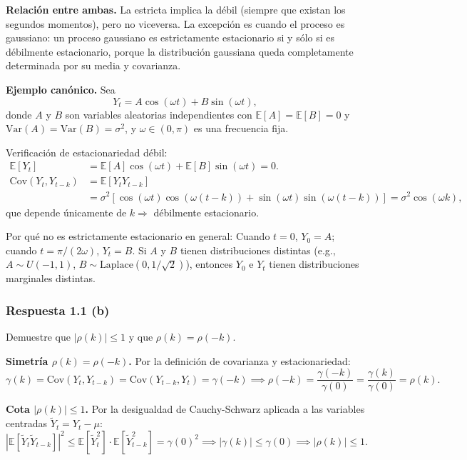 \documentclass[12pt, letterpaper]{article}
\begin{document}
\textbf{Relación entre ambas.} La estricta implica la débil (siempre que existan los segundos momentos), pero no viceversa. La excepción es cuando el proceso es gaussiano: un proceso gaussiano es estrictamente estacionario si y sólo si es débilmente estacionario, porque la distribución gaussiana queda completamente determinada por su media y covarianza.

\textbf{Ejemplo canónico.} Sea
\[
Y_t = A \cos(\omega t) + B \sin(\omega t),
\]
donde $A$ y $B$ son variables aleatorias independientes con $\mathbb{E}[A] = \mathbb{E}[B] = 0$ y $\text{Var}(A) = \text{Var}(B) = \sigma^2$, y $\omega \in (0, \pi)$ es una frecuencia fija.

Verificación de estacionariedad débil:
\begin{align*}
\mathbb{E}[Y_t] &= \mathbb{E}[A] \cos(\omega t) + \mathbb{E}[B] \sin(\omega t) = 0. \\
\text{Cov}(Y_t, Y_{t-k}) &= \mathbb{E}[Y_t Y_{t-k}] \\
&= \sigma^2 [\cos(\omega t) \cos(\omega(t-k)) + \sin(\omega t) \sin(\omega(t-k))] = \sigma^2 \cos(\omega k),
\end{align*}
que depende únicamente de $k \Rightarrow$ débilmente estacionario.

Por qué no es estrictamente estacionario en general: Cuando $t=0$, $Y_0 = A$; cuando $t = \pi/(2\omega)$, $Y_t = B$. Si $A$ y $B$ tienen distribuciones distintas (e.g., $A\sim U(-1,1)$, $B\sim \text{Laplace}(0,1/\sqrt{2})$), entonces $Y_0$ e $Y_t$ tienen distribuciones marginales distintas.

\subsubsection*{Respuesta 1.1 (b)}

Demuestre que $|\rho(k)| \leq 1$ y que $\rho(k) = \rho(-k)$.

\textbf{Simetría $\rho(k) = \rho(-k)$.} Por la definición de covarianza y estacionariedad:
\[
\gamma(k) = \text{Cov}(Y_t, Y_{t-k}) = \text{Cov}(Y_{t-k}, Y_t) = \gamma(-k) \implies \rho(-k) = \frac{\gamma(-k)}{\gamma(0)} = \frac{\gamma(k)}{\gamma(0)} = \rho(k).
\]

\textbf{Cota $|\rho(k)| \leq 1$.} Por la desigualdad de Cauchy-Schwarz aplicada a las variables centradas $\tilde{Y}_t = Y_t - \mu$:
\[
|\mathbb{E}[\tilde{Y}_t \tilde{Y}_{t-k}]|^2 \leq \mathbb{E}[\tilde{Y}_t^2] \cdot \mathbb{E}[\tilde{Y}_{t-k}^2] = \gamma(0)^2 \implies |\gamma(k)| \leq \gamma(0) \implies |\rho(k)| \leq 1.
\]
\end{document}
